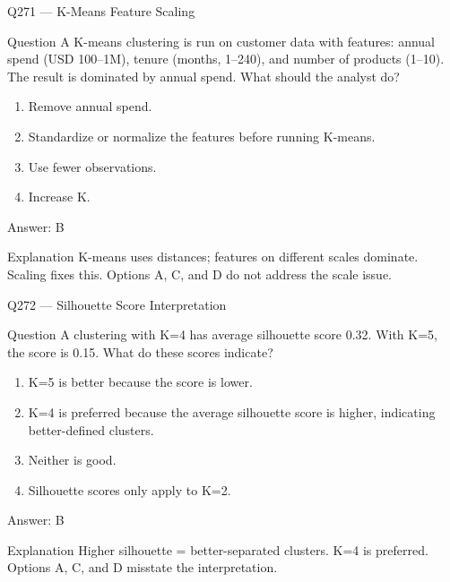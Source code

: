 \documentclass[aspectratio=169,8pt]{beamer}
\begin{document}

\begin{frame}{Q271 --- K-Means Feature Scaling}
\begin{block}{Question}
A K-means clustering is run on customer data with features: annual spend (USD 100--1M), tenure (months, 1--240), and number of products (1--10). The result is dominated by annual spend. What should the analyst do?
\end{block}
\begin{enumerate}
\item Remove annual spend.
\item Standardize or normalize the features before running K-means.
\item Use fewer observations.
\item Increase K.
\end{enumerate}
\begin{exampleblock}{Answer: B}\end{exampleblock}
\begin{block}{Explanation}
K-means uses distances; features on different scales dominate. Scaling fixes this. Options A, C, and D do not address the scale issue.
\end{block}
\end{frame}

\begin{frame}{Q272 --- Silhouette Score Interpretation}
\begin{block}{Question}
A clustering with K=4 has average silhouette score 0.32. With K=5, the score is 0.15. What do these scores indicate?
\begin{enumerate}
\item K=5 is better because the score is lower.
\item K=4 is preferred because the average silhouette score is higher, indicating better-defined clusters.
\item Neither is good.
\item Silhouette scores only apply to K=2.
\end{enumerate}  \end{block}
\begin{exampleblock}{Answer: B}\end{exampleblock}
\begin{block}{Explanation}
Higher silhouette = better-separated clusters. K=4 is preferred. Options A, C, and D misstate the interpretation.
\end{block}
\end{frame}
\end{document}
